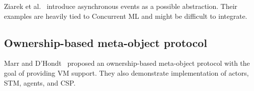 \documentclass{sig-alternate}
\begin{document}
Ziarek et al.~\cite{Ziarek2011} introduce asynchronous events as a possible abstraction. Their examples are heavily tied to Concurrent ML and might be difficult to integrate.

\subsection{Ownership-based meta-object protocol}

Marr and D'Hondt~\cite{Marr2012} proposed an ownership-based meta-object protocol with the goal of providing VM support. They also demonstrate implementation of actors, STM, agents, and CSP.

\printbibliography{}
\end{document}
